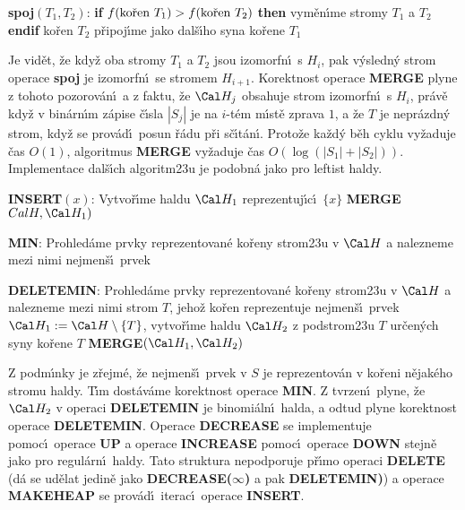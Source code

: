 {\bf spoj$(T_1,T_2)$}:\newline 
{\bf if} $f(\text{\rm ko\v ren }T_1)>f(\text{\rm ko\v ren }T_2)$ {\bf then}\newline 
\phantom{---}vym\v en\'\i me stromy $T_1$ a $T_2$\newline 
{\bf endif}\newline 
ko\v ren $T_2$ p\v ripoj\'\i me jako dal\v s\'\i ho syna ko\v rene $
T_1$
\medskip

\flushpar Je vid\v et, \v ze kdy\v z oba stromy $T_1$ a $T_2$ jsou 
izomorfn\'\i\ s $H_i$, pak v\'ysledn\'y strom operace {\bf spoj} je 
izomorfn\'\i\ se stromem $H_{i+1}$. Korektnost ope\-race {\bf MERGE} plyne z tohoto pozorov\'an\'\i\ a z faktu, \v ze $\Cal H_j$ obsahuje strom 
izomorfn\'\i\ s $H_i$, pr\'av\v e kdy\v z v bin\'arn\'\i m z\'apise 
\v c\'\i sla $|S_j|$ je na $i$-t\'em 
m\'\i st\v e zprava $1$, a \v ze $T$ je nepr\'azdn\'y strom, kdy\v z se 
prov\'ad\'\i\ posun \v r\'adu p\v ri s\v c\'\i t\'an\'\i . Proto\v ze ka\v zd\'y b\v eh 
cyklu vy\v zaduje \v cas $O(1)$, algoritmus {\bf MER\-GE} vy\v zaduje \v cas 
$O(\log(|S_1|+|S_2|))$. Implementace dal\v s\'\i ch algoritm\accent23u 
je podobn\'a jako pro leftist haldy. 
\bigskip

{\bf INSERT$(x)$}:\newline 
Vytvo\v r\'\i me haldu $\Cal H_1$ reprezentuj\'\i c\'\i\ $\{x\}$\newline 
{\bf MERGE}$Cal H,\Cal H_1)$
\bigskip

{\bf MIN}:\newline 
Prohled\'ame prvky reprezentovan\'e ko\v reny strom\accent23u 
v $\Cal H$ a nalez\-ne\-me mezi nimi nejmen\v s\'\i\ prvek
\bigskip

{\bf DELETEMIN}:\newline 
Prohled\'ame prvky reprezentovan\'e ko\v reny strom\accent23u 
v $\Cal H$ a nalez\-neme mezi nimi strom $T$, jeho\v z ko\v ren reprezentuje 
nejmen\v s\'\i\ prvek\newline
$\Cal H_1:=\Cal H\setminus \{T\}$, vytvo\v r\'\i me haldu $
\Cal H_2$ z podstrom\accent23u $T$ ur\v cen\'ych syny ko\v rene $T$\newline 
{\bf MERGE$(\Cal H_1,\Cal H_2)$}
\bigskip

\flushpar Z podm\'\i nky  je z\v rejm\'e, \v ze 
nejmen\v s\'\i\ prvek v $S$ je reprezentov\'an v ko\v reni n\v ejak\'eho  
stromu haldy. T\'\i m dost\'av\'ame korekt\-nost ope\-race {\bf MIN}.
Z tvrzen\'\i\ plyne, \v ze $\Cal H_2$ v ope\-raci {\bf DELE\-TE\-MIN} je 
binomi\'aln\'\i\ halda, a odtud plyne korekt\-nost ope\-race 
{\bf DE\-LE\-TEMIN}. Operace {\bf DECREASE} se implementuje pomoc\'\i\ 
ope\-race {\bf UP} a ope\-race {\bf INCREASE} pomoc\'\i\ 
ope\-race {\bf DOWN} stejn\v e jako pro regul\'arn\'\i\ haldy. Tato 
struktura nepodporuje p\v r\'\i mo operaci {\bf DELETE} (d\'a se ud\v elat 
jedin\v e jako {\bf DECREASE($\infty$)} a pak {\bf DELETEMIN)}) a ope\-race 
{\bf MAKEHEAP} se prov\'ad\'\i\ iterac\'\i\ operace {\bf INSERT}.
\medskip

